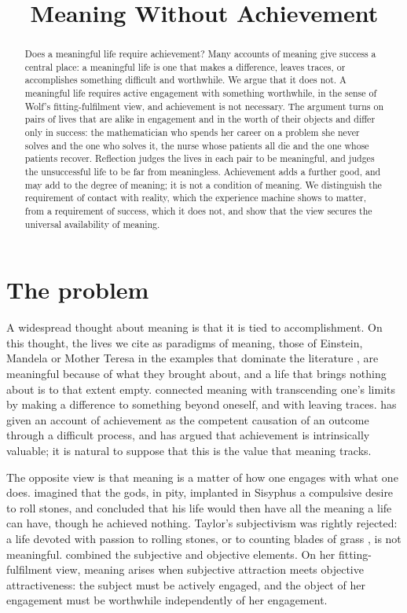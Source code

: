 \documentclass{situationist-preprint}
\title{Meaning Without Achievement}
\begin{document}
\maketitle

\begin{abstract}
Does a meaningful life require achievement? Many accounts of meaning give success a central place: a meaningful life is one that makes a difference, leaves traces, or accomplishes something difficult and worthwhile. We argue that it does not. A meaningful life requires active engagement with something worthwhile, in the sense of Wolf's fitting-fulfilment view, and achievement is not necessary. The argument turns on pairs of lives that are alike in engagement and in the worth of their objects and differ only in success: the mathematician who spends her career on a problem she never solves and the one who solves it, the nurse whose patients all die and the one whose patients recover. Reflection judges the lives in each pair to be meaningful, and judges the unsuccessful life to be far from meaningless. Achievement adds a further good, and may add to the degree of meaning; it is not a condition of meaning. We distinguish the requirement of contact with reality, which the experience machine shows to matter, from a requirement of success, which it does not, and show that the view secures the universal availability of meaning.
\end{abstract}

\section{The problem}

A widespread thought about meaning is that it is tied to accomplishment. On this thought, the lives we cite as paradigms of meaning, those of Einstein, Mandela or Mother Teresa in the examples that dominate the literature \citep{Metz2013}, are meaningful because of what they brought about, and a life that brings nothing about is to that extent empty. \citet[ch.~6]{Nozick1981} connected meaning with transcending one's limits by making a difference to something beyond oneself, and with leaving traces. \citet{Bradford2015} has given an account of achievement as the competent causation of an outcome through a difficult process, and has argued that achievement is intrinsically valuable; it is natural to suppose that this is the value that meaning tracks.

The opposite view is that meaning is a matter of how one engages with what one does. \citet{Taylor1970} imagined that the gods, in pity, implanted in Sisyphus a compulsive desire to roll stones, and concluded that his life would then have all the meaning a life can have, though he achieved nothing. Taylor's subjectivism was rightly rejected: a life devoted with passion to rolling stones, or to counting blades of grass \citep[\S65]{Rawls1971}, is not meaningful. \citet{Wolf1997,Wolf2010} combined the subjective and objective elements. On her fitting-fulfilment view, meaning arises when subjective attraction meets objective attractiveness: the subject must be actively engaged, and the object of her engagement must be worthwhile independently of her engagement.
\end{document}
